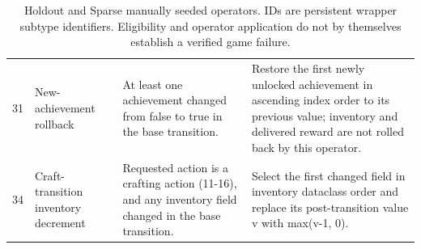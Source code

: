 \begin{table}[t]
\begin{tabularx}{\textwidth}{@{}r p{} >{\raggedright\arraybackslash}X >{\raggedright\arraybackslash}X@{}}
31 & New-achievement rollback & At least one achievement changed from false to true in the base transition. & Restore the first newly unlocked achievement in ascending index order to its previous value; inventory and delivered reward are not rolled back by this operator. \\
34 & Craft-transition inventory decrement & Requested action is a crafting action (11-16), and any inventory field changed in the base transition. & Select the first changed field in inventory dataclass order and replace its post-transition value v with max(v-1, 0). \\
\bottomrule
\end{tabularx}
\caption{Holdout and Sparse manually seeded operators. IDs are persistent wrapper subtype identifiers. Eligibility and operator application do not by themselves establish a verified game failure.}
\label{tab:tea-operators-holdout-sparse}
\end{table}
